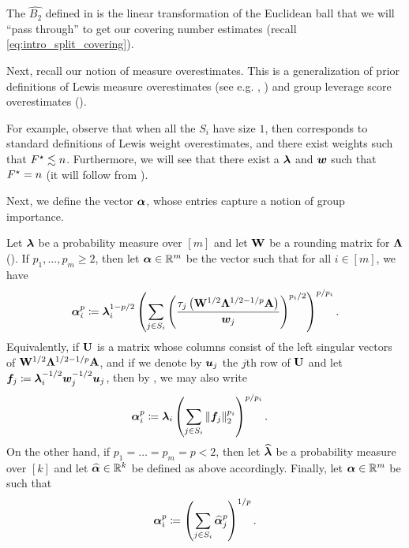 \documentclass[11pt]{article}
\numberwithin{equation}{section}
\begin{document}
The $\widehat{B_2}$ defined in  is the linear transformation of the Euclidean ball that we will ``pass through'' to get our covering number estimates (recall \eqref{eq:intro_split_covering}).

Next, recall our notion of measure overestimates. This is a generalization of prior definitions of Lewis measure overestimates (see e.g. \cite[Definition 2.4]{jls21}, \cite[Definition 2.3]{wy22}) and group leverage score overestimates (\cite[Definition 1.1]{jls22}).

\blocklewisoverestimate*

For example, observe that when all the $S_i$ have size $1$, then  corresponds to standard definitions of Lewis weight overestimates, and there exist weights such that $F^{\star} \lesssim n$. Furthermore, we will see that there exist a $\bm{\lambda}$ and $\bm{w}$ such that $F^{\star} = n$ (it will follow from ).

Next, we define the vector $\bm{\alpha}$, whose entries capture a notion of group importance.

\begin{definition}
\label{defn:alpha}
Let $\bm{\lambda}$ be a probability measure over $[m]$ and let $\mathbf{W}$ be a rounding matrix for $\mathbf{\Lambda}$ (). If $p_1,\dots,p_m \ge 2$, then let $\bm{\alpha} \in \mathbb{R}^{m}$ be the vector such that for all $i \in [m]$, we have
\begin{align*}
    \bm{\alpha}_i^p \coloneqq \bm{\lambda}_i^{1-p/2}\left(\sum_{j\in S_i}\left(\frac{\tau_j\left(\mathbf{W}^{1/2}\mathbf{\Lambda}^{1/2-1/p}\mathbf{A}\right)}{\bm{w}_j}\right)^{p_i/2}\right)^{p/p_i}.
\end{align*}
Equivalently, if $\mathbf{U}$ is a matrix whose columns consist of the left singular vectors of $\mathbf{W}^{1/2}\mathbf{\Lambda}^{1/2-1/p}\mathbf{A}$, and if we denote by $\bm{u}_j$ the $j$th row of $\mathbf{U}$ and let $\bm{f}_j \coloneqq \bm{\lambda}_{i}^{-1/2}\bm{w}_j^{-1/2}\bm{u}_j$, then by , we may also write
\begin{align*}
    \bm{\alpha}_i^p &\coloneqq \bm{\lambda}_i\left(\sum_{j \in S_i} \left\lVert \bm{f}_j \right\rVert_2^{p_i}\right)^{p/p_i}.
\end{align*}
On the other hand, if $p_1=\dots=p_m=p<2$, then let $\widehat{\bm{\lambda}}$ be a probability measure over $[k]$ and let $\widehat{\bm{\alpha}}\in\mathbb{R}^k$ be defined as above accordingly. Finally, let $\bm{\alpha}\in\mathbb{R}^m$ be such that
\begin{align*}
    \bm{\alpha}_i^p \coloneqq \left(\sum_{j \in S_i}\widehat{\bm{\alpha}}_j^p\right)^{1/p}.
\end{align*}
\end{definition}
\end{document}
